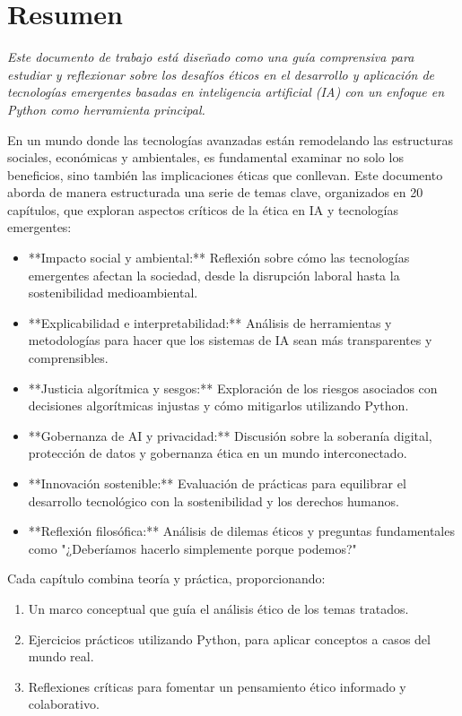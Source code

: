 \chapter*{Resumen}

\emph{Este documento de trabajo está diseñado como una guía comprensiva para estudiar y reflexionar sobre los desafíos éticos en el desarrollo y aplicación de tecnologías emergentes basadas en inteligencia artificial (IA) con un enfoque en Python como herramienta principal.}

En un mundo donde las tecnologías avanzadas están remodelando las estructuras sociales, económicas y ambientales, es fundamental examinar no solo los beneficios, sino también las implicaciones éticas que conllevan. Este documento aborda de manera estructurada una serie de temas clave, organizados en 20 capítulos, que exploran aspectos críticos de la ética en IA y tecnologías emergentes:

\begin{itemize}
    \item **Impacto social y ambiental:** Reflexión sobre cómo las tecnologías emergentes afectan la sociedad, desde la disrupción laboral hasta la sostenibilidad medioambiental.
    \item **Explicabilidad e interpretabilidad:** Análisis de herramientas y metodologías para hacer que los sistemas de IA sean más transparentes y comprensibles.
    \item **Justicia algorítmica y sesgos:** Exploración de los riesgos asociados con decisiones algorítmicas injustas y cómo mitigarlos utilizando Python.
    \item **Gobernanza de AI  y privacidad:** Discusión sobre la soberanía digital, protección de datos y gobernanza ética en un mundo interconectado.
    \item **Innovación sostenible:** Evaluación de prácticas para equilibrar el desarrollo tecnológico con la sostenibilidad y los derechos humanos.
    \item **Reflexión filosófica:** Análisis de dilemas éticos y preguntas fundamentales como "¿Deberíamos hacerlo simplemente porque podemos?"
\end{itemize}

Cada capítulo combina teoría y práctica, proporcionando:
\begin{enumerate}
    \item Un marco conceptual que guía el análisis ético de los temas tratados.
    \item Ejercicios prácticos utilizando Python, para aplicar conceptos a casos del mundo real.
    \item Reflexiones críticas para fomentar un pensamiento ético informado y colaborativo.
\end{enumerate}

